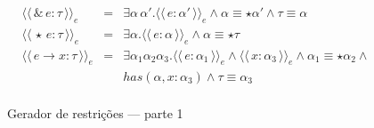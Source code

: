 \documentclass[a4paper,8pt]{article}
\newcommand{\constre}[1]{\ensuremath{\langle\langle\,#1\,\rangle\rangle_{e}}}
\begin{document}
\begin{figure}[h]
\[{\begin{array}{lcl}
                     \constre{\&\,e : \tau} & = & \exists \alpha\,
                                                 \alpha'. \constre{e :
                                                 \alpha'} \land
                                                 \alpha \equiv \star \alpha'
                                                 \land \tau \equiv \alpha\\
                     \constre{\star\,e : \tau} & = & \exists
                                                    \alpha. \constre{e
                                                    : \alpha} \land
                                                    \alpha \equiv \star \tau\\
                     \constre{e\to x : \tau} & = & \exists
                                                  \alpha_1\alpha_2\alpha_3. \constre{e
                                                  :\alpha_1} \land
                                                  \constre{x :
                                                  \alpha_3} \land
                                                  \alpha_1 \equiv \star\alpha_2
                                                  \land\\
                          & & has(\alpha,x : \alpha_3) \land \tau
                              \equiv \alpha_3\\
            \end{array}}
       \]
       \centering
       \caption{Gerador de restrições --- parte 1}
       \label{figgen1}
     \end{figure}
\end{document}
